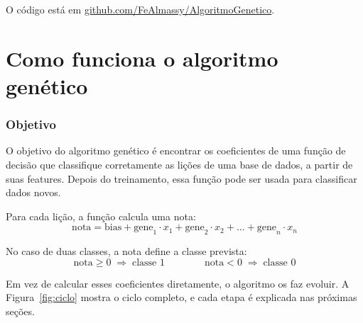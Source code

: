 \documentclass[11pt,a4paper]{article}
\begin{document}
O código está em \href{https://github.com/FeAlmassy/AlgoritmoGenetico}{github.com/FeAlmassy/AlgoritmoGenetico}.

\clearpage
\part{Como funciona o algoritmo genético}

\section{Objetivo}

O objetivo do algoritmo genético é encontrar os coeficientes de uma função de decisão que classifique corretamente as lições de uma base de dados, a partir de suas features. Depois do treinamento, essa função pode ser usada para classificar dados novos.

Para cada lição, a função calcula uma nota:
\[
  \text{nota} = \text{bias} + \text{gene}_1 \cdot x_1 + \text{gene}_2 \cdot x_2 + \dots + \text{gene}_n \cdot x_n
\]

No caso de duas classes, a nota define a classe prevista:
\[
  \text{nota} \geq 0 \;\Rightarrow\; \text{classe } 1
  \qquad\qquad
  \text{nota} < 0 \;\Rightarrow\; \text{classe } 0
\]

Em vez de calcular esses coeficientes diretamente, o algoritmo os faz evoluir. A Figura~\ref{fig:ciclo} mostra o ciclo completo, e cada etapa é explicada nas próximas seções.
\end{document}
